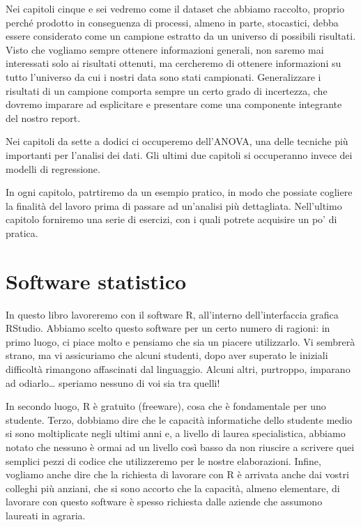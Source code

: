 \documentclass[a4paper,12pt,oneside]{book}
\begin{document}
Nei capitoli cinque e sei vedremo come il dataset che abbiamo raccolto, proprio perché prodotto in conseguenza di processi, almeno in parte, stocastici, debba essere considerato come un campione estratto da un universo di possibili risultati. Visto che vogliamo sempre ottenere informazioni generali, non saremo mai interessati solo ai risultati ottenuti, ma cercheremo di ottenere informazioni su tutto l'universo da cui i nostri data sono stati campionati. Generalizzare i risultati di un campione comporta sempre un certo grado di incertezza, che dovremo imparare ad esplicitare e presentare come una componente integrante del nostro report.

Nei capitoli da sette a dodici ci occuperemo dell'ANOVA, una delle tecniche più importanti per l'analisi dei dati. Gli ultimi due capitoli si occuperanno invece dei modelli di regressione.

In ogni capitolo, patrtiremo da un esempio pratico, in modo che possiate cogliere la finalità del lavoro prima di passare ad un'analisi più dettagliata. Nell'ultimo capitolo forniremo una serie di esercizi, con i quali potrete acquisire un po' di pratica.

\hypertarget{software-statistico}{%
\section*{Software statistico}\label{software-statistico}}

In questo libro lavoreremo con il software R, all'interno dell'interfaccia grafica RStudio. Abbiamo scelto questo software per un certo numero di ragioni: in primo luogo, ci piace molto e pensiamo che sia un piacere utilizzarlo. Vi sembrerà strano, ma vi assicuriamo che alcuni studenti, dopo aver superato le iniziali difficoltà rimangono affascinati dal linguaggio. Alcuni altri, purtroppo, imparano ad odiarlo\ldots{} speriamo nessuno di voi sia tra quelli!

In secondo luogo, R è gratuito (freeware), cosa che è fondamentale per uno studente. Terzo, dobbiamo dire che le capacità informatiche dello studente medio si sono moltiplicate negli ultimi anni e, a livello di laurea specialistica, abbiamo notato che nessuno è ormai ad un livello così basso da non riuscire a scrivere quei semplici pezzi di codice che utilizzeremo per le nostre elaborazioni. Infine, vogliamo anche dire che la richiesta di lavorare con R è arrivata anche dai vostri colleghi più anziani, che si sono accorto che la capacità, almeno elementare, di lavorare con questo software è spesso richiesta dalle aziende che assumono laureati in agraria.
\end{document}

